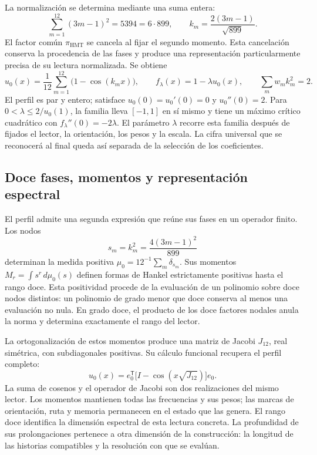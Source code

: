 La normalización se determina mediante una suma entera:
\[
\sum_{m=1}^{12}(3m-1)^2=5394=6\cdot899,
\qquad k_m=\frac{2(3m-1)}{\sqrt{899}}.
\]
El factor común \(\pi_{\mathrm{HMT}}\) se cancela al fijar el segundo momento.
Esta cancelación conserva la procedencia de las fases y produce una
representación particularmente precisa de su lectura normalizada. Se obtiene
\[
u_0(x)=\frac1{12}\sum_{m=1}^{12}\bigl(1-\cos(k_mx)\bigr),
\qquad f_\lambda(x)=1-\lambda u_0(x),
\qquad \sum_mw_mk_m^2=2.
\]
El perfil es par y entero; satisface \(u_0(0)=u_0'(0)=0\) y
\(u_0''(0)=2\). Para \(0<\lambda\le2/u_0(1)\), la familia lleva
\([-1,1]\) en sí mismo y tiene un máximo crítico cuadrático con
\(f_\lambda''(0)=-2\lambda\). El parámetro \(\lambda\) recorre esta familia
después de fijados el lector, la orientación, los pesos y la escala. La cifra
universal que se reconocerá al final queda así separada de la selección de
los coeficientes.

\subsection{Doce fases, momentos y representación espectral}

El perfil admite una segunda expresión que reúne sus fases en un operador
finito. Los nodos
\[
s_m=k_m^2=\frac{4(3m-1)^2}{899}
\]
determinan la medida positiva \(\mu_0=12^{-1}\sum_m\delta_{s_m}\). Sus
momentos \(M_r=\int s^r\,d\mu_0(s)\) definen formas de Hankel estrictamente
positivas hasta el rango doce. Esta positividad procede de la evaluación de
un polinomio sobre doce nodos distintos: un polinomio de grado menor que
doce conserva al menos una evaluación no nula. En grado doce, el producto
de los doce factores nodales anula la norma y determina exactamente el rango
del lector.

La ortogonalización de estos momentos produce una matriz de Jacobi
\(J_{12}\), real simétrica, con subdiagonales positivas. Su cálculo funcional
recupera el perfil completo:
\[
u_0(x)=e_0^{\mathsf T}
\bigl[I-\cos(x\sqrt{J_{12}})\bigr]e_0.
\]
La suma de cosenos y el operador de Jacobi son dos realizaciones del mismo
lector. Los momentos mantienen todas las frecuencias y sus pesos; las
marcas de orientación, ruta y memoria permanecen en el estado que las
genera. El rango doce identifica la dimensión espectral de esta lectura
concreta. La profundidad de sus prolongaciones pertenece a otra dimensión
de la construcción: la longitud de las historias compatibles y la resolución
con que se evalúan.

